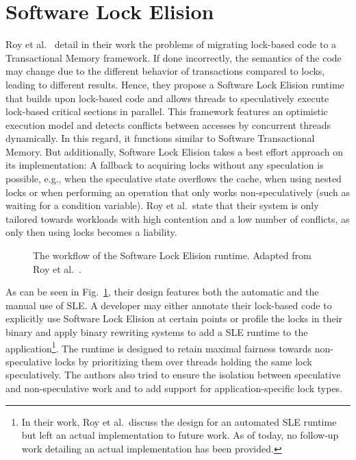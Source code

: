\section{Software Lock Elision}%
\label{sec:related:sle}
Roy et al.~\cite{roy2009runtime} detail in their work the problems of migrating lock-based code to a Transactional Memory framework.
If done incorrectly, the semantics of the code may change due to the different behavior of transactions compared to locks, leading to different results.
Hence, they propose a Software Lock Elision runtime that builds upon lock-based code and allows threads to speculatively execute lock-based critical sections in parallel.
This framework features an optimistic execution model and detects conflicts between accesses by concurrent threads dynamically.
In this regard, it functions similar to Software Transactional Memory.
But additionally, Software Lock Elision takes a best effort approach on its implementation:
A fallback to acquiring locks without any speculation is possible, e.g., when the speculative state overflows the cache, when using nested locks or when performing an operation that only works non-speculatively (such as waiting for a condition variable).
Roy et al.\ state that their system is only tailored towards workloads with high contention and a low number of conflicts, as only then using locks becomes a liability.

\begin{figure}
    \caption{The workflow of the Software Lock Elision runtime. Adapted from Roy et al.~\cite{roy2009runtime}.}%
    \label{fig:related:sle}
\end{figure}

As can be seen in Fig.~\ref{fig:related:sle}, their design features both the automatic and the manual use of SLE.
A developer may either annotate their lock-based code to explicitly use Software Lock Elision at certain points or profile the locks in their binary and apply binary rewriting systems to add a SLE runtime to the application\footnote{In their work, Roy et al.\ discuss the design for an automated SLE runtime but left an actual implementation to future work. As of today, no follow-up work detailing an actual implementation has been provided.}.
The runtime is designed to retain maximal fairness towards non-speculative locks by prioritizing them over threads holding the same lock speculatively.
The authors also tried to ensure the isolation between speculative and non-speculative work and to add support for application-specific lock types.

